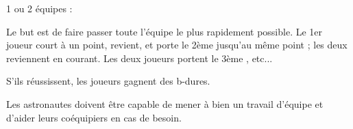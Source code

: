 \documentclass{grand-jeu}
\begin{document}
\begin{regles}
1 ou 2 équipes :

Le but est de faire passer toute l’équipe le plus rapidement possible. 
Le 1er joueur court à un point, revient, et porte le 2ème jusqu’au même point ; les deux reviennent en courant. Les deux joueurs portent le 3ème , etc... 

S’ils réussissent, les joueurs gagnent des b-dures. 
\end{regles}

\begin{imaginaire}
Les astronautes doivent être capable de mener à bien un travail d'équipe et d'aider leurs coéquipiers en cas de besoin. 
\end{imaginaire}

\begin{moments-stop}
\end{moments-stop}
\end{document}
